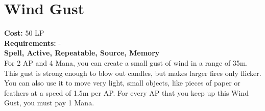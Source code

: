 \section{Wind Gust}\label{spell:windGust}
\textbf{Cost:} 50 LP\\
\textbf{Requirements:} -\\
\textbf{Spell, Active, Repeatable, Source, Memory}\\
For 2 AP and 4 Mana, you can create a small gust of wind in a range of 35m.
This gust is strong enough to blow out candles, but makes larger fires only flicker.
You can also use it to move very light, small objects, like pieces of paper or feathers at a speed of 1.5m per AP.
For every AP that you keep up this Wind Gust, you must pay 1 Mana.